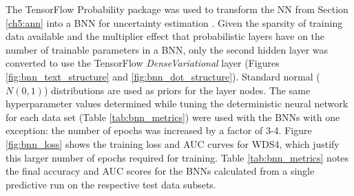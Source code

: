 The TensorFlow Probability package was used to transform the NN from Section \ref{ch5:ann} into a BNN for uncertainty estimation \citep{dillon_tensorflow_2017}.  Given the sparsity of training data available and the multiplier effect that probabilistic layers have on the number of trainable parameters in a BNN, only the second hidden layer was converted to use the TensorFlow \textit{DenseVariational} layer (Figures \ref{fig:bnn_text_structure} and \ref{fig:bnn_dot_structure}). Standard normal ($N(0,1)$) distributions are used as priors for the layer nodes. The same hyperparameter values determined while tuning the deterministic neural network for each data set (Table \ref{tab:bnn_metrics}) were used with the BNNs with one exception: the number of epochs was increased by a factor of 3-4. Figure \ref{fig:bnn_loss} shows the training loss and AUC curves for WDS4, which justify this larger number of epochs required for training. Table \ref{tab:bnn_metrics} notes the final accuracy and AUC scores for the BNNs calculated from a single predictive run on the respective test data subsets.

